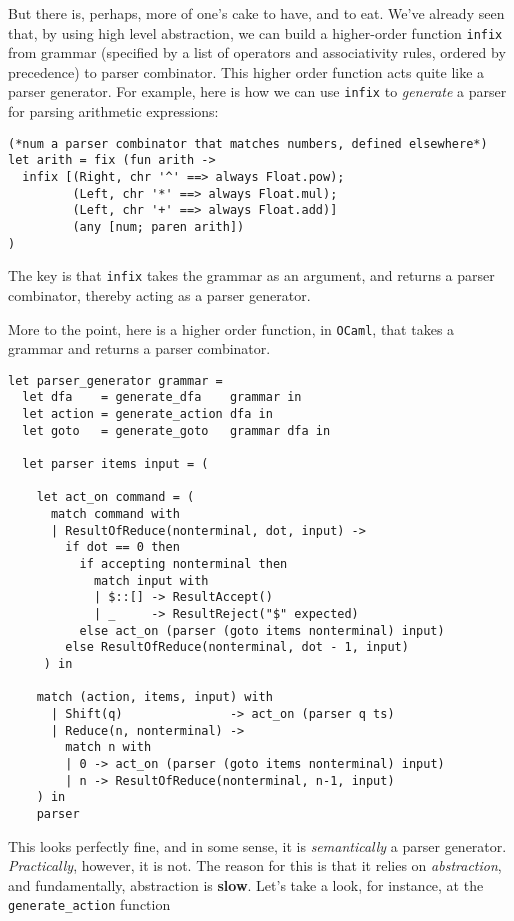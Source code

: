 But there is, perhaps, more of one's cake to have, and to eat. We've already seen that, by using high level abstraction, we can build a higher-order function \texttt{infix} from grammar (specified by a list of operators and associativity rules, ordered by precedence) to parser combinator. This higher order function acts quite like a parser generator. For example, here is how we can use \texttt{infix} to \textit{generate} a parser for parsing arithmetic expressions:

\begin{verbatim}
(*num a parser combinator that matches numbers, defined elsewhere*)
let arith = fix (fun arith ->
  infix [(Right, chr '^' ==> always Float.pow);
         (Left, chr '*' ==> always Float.mul);
         (Left, chr '+' ==> always Float.add)]
         (any [num; paren arith])
)
\end{verbatim}

The key is that \texttt{infix} takes the grammar as an argument, and returns a parser combinator, thereby acting as a parser generator. 

More to the point, here is a higher order function, in \texttt{OCaml}, that takes a grammar and returns a parser combinator.

\begin{verbatim}
let parser_generator grammar =
  let dfa    = generate_dfa    grammar in
  let action = generate_action dfa in
  let goto   = generate_goto   grammar dfa in

  let parser items input = (

    let act_on command = (
      match command with
      | ResultOfReduce(nonterminal, dot, input) -> 
        if dot == 0 then
          if accepting nonterminal then 
            match input with
            | $::[] -> ResultAccept()
            | _     -> ResultReject("$" expected)
          else act_on (parser (goto items nonterminal) input)
        else ResultOfReduce(nonterminal, dot - 1, input)
     ) in 
    
    match (action, items, input) with
      | Shift(q)               -> act_on (parser q ts) 
      | Reduce(n, nonterminal) -> 
        match n with 
        | 0 -> act_on (parser (goto items nonterminal) input)
        | n -> ResultOfReduce(nonterminal, n-1, input)
    ) in 
    parser
\end{verbatim}
This looks perfectly fine, and in some sense, it is \textit{semantically} a parser generator. \textit{Practically}, however, it is not. The reason for this is that it relies on \textit{abstraction}, and fundamentally, abstraction is \textbf{slow}. Let's take a look, for instance, at the \texttt{generate\_action} function


